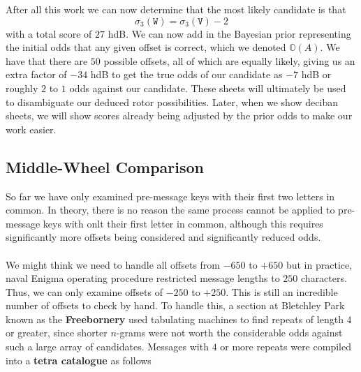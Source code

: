\noindent After all this work we can now determine that the most
likely candidate is that
\[
  \sigma_3(\texttt{W}) = \sigma_3(\texttt{V}) - 2
\]
with a total score of $27$ hdB. We can now add in the Bayesian
prior representing the initial odds that any given offset is
correct, which we denoted $\mathbb{O}(A)$. We have that there are
$50$ possible offsets, all of which are equally likely, giving us
an extra factor of $-34$ hdB to get the true odds of our candidate
as $-7$ hdB or roughly $2$ to $1$ odds against our candidate. These
sheets will ultimately be used to disambiguate our deduced rotor
possibilities. Later, when we show deciban sheets, we will show
scores already being adjusted by the prior odds to make our work easier.

\subsection{Middle-Wheel Comparison}
So far we have only examined pre-message keys with their first two
letters in common. In theory, there is no reason the same process
cannot be applied to pre-message keys with onlt their first letter in
common, although this requires significantly more offsets being
considered and significantly reduced odds.
\\\\We might think we need to handle all offsets from $-650$ to
$+650$ but in practice, naval Enigma operating procedure restricted
message lengths to $250$ characters. Thus, we can only examine
offsets of $-250$ to $+250$. This is still an incredible number of
offsets to check by hand. To handle this, a section at Bletchley
Park known as the {\bf{Freebornery}} used tabulating machines to
find repeats of length $4$ or greater, since shorter $n$-grams were
not worth the considerable odds against such a large array of
candidates. Messages with $4$ or more repeats were compiled into a
{\bf{tetra catalogue}} as follows

